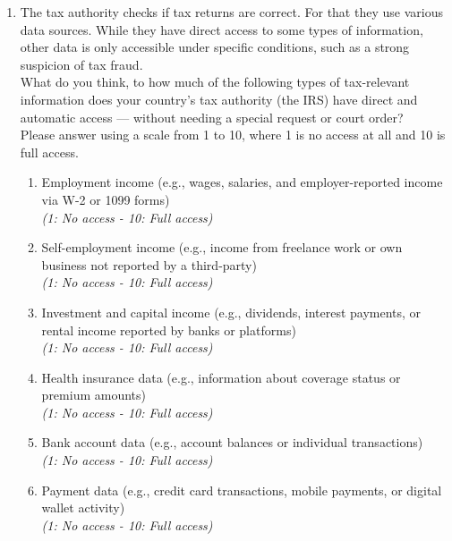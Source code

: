 \documentclass[11pt]{article}
\begin{document}
\begin{enumerate}[resume]
    \item The tax authority checks if tax returns are correct. For that they use various data sources. While they have direct access to some types of information, other data is only accessible under specific conditions, such as a strong suspicion of tax fraud.\\
    What do you think, to how much of the following types of tax-relevant information does your country’s tax authority (the IRS) have direct and automatic access — without needing a special request or court order? \\ 
    Please answer using a scale from 1 to 10, where 1 is no access at all and 10 is full access.
    \begin{enumerate}[label=\alph*)]
        \item Employment income (e.g., wages, salaries, and employer-reported income via W-2 or 1099 forms) \\ \textit{(1: No access - 10: Full access)}
        \item Self-employment income (e.g., income from freelance work or own business not reported by a third-party) \\ \textit{(1: No access - 10: Full access)}
        \item Investment and capital income (e.g., dividends, interest payments, or rental income reported by banks or platforms) \\ \textit{(1: No access - 10: Full access)}
        \item Health insurance data (e.g., information about coverage status or premium amounts) \\ \textit{(1: No access - 10: Full access)}
        \item Bank account data (e.g., account balances or individual transactions) \\ \textit{(1: No access - 10: Full access)}
        \item Payment data (e.g., credit card transactions, mobile payments, or digital wallet activity) \\ \textit{(1: No access - 10: Full access)}
    \end{enumerate}
\end{enumerate}
\end{document}
